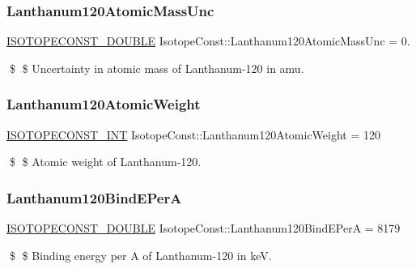 \subsubsection{\texorpdfstring{Lanthanum120\+Atomic\+Mass\+Unc}{Lanthanum120AtomicMassUnc}}
{\footnotesize\ttfamily \mbox{\hyperlink{group___isotope_const-_macros_ga8f45a7272ce02c0b4c65c44636ed719a}{I\+S\+O\+T\+O\+P\+E\+C\+O\+N\+S\+T\+\_\+\+D\+O\+U\+B\+LE}} Isotope\+Const\+::\+Lanthanum120\+Atomic\+Mass\+Unc = 0.}

\$ \$ Uncertainty in atomic mass of Lanthanum-\/120 in amu. \mbox{\label{group___isotope_const-_lanthanum-_la120_ga5cd0cd9389b0616c98cf43fd4cc3af81}} 
\subsubsection{\texorpdfstring{Lanthanum120\+Atomic\+Weight}{Lanthanum120AtomicWeight}}
{\footnotesize\ttfamily \mbox{\hyperlink{group___isotope_const-_macros_ga5f18360b3e99483a35c32d789e62621c}{I\+S\+O\+T\+O\+P\+E\+C\+O\+N\+S\+T\+\_\+\+I\+NT}} Isotope\+Const\+::\+Lanthanum120\+Atomic\+Weight = 120}

\$ \$ Atomic weight of Lanthanum-\/120. \mbox{\label{group___isotope_const-_lanthanum-_la120_ga0605bc9f3d095463290956c5f8603b5c}} 
\subsubsection{\texorpdfstring{Lanthanum120\+Bind\+E\+PerA}{Lanthanum120BindEPerA}}
{\footnotesize\ttfamily \mbox{\hyperlink{group___isotope_const-_macros_ga8f45a7272ce02c0b4c65c44636ed719a}{I\+S\+O\+T\+O\+P\+E\+C\+O\+N\+S\+T\+\_\+\+D\+O\+U\+B\+LE}} Isotope\+Const\+::\+Lanthanum120\+Bind\+E\+PerA = 8179}

\$ \$ Binding energy per A of Lanthanum-\/120 in keV. \mbox{\label{group___isotope_const-_lanthanum-_la120_ga6334aa015500b02e2844e7dbb78a0703}} 
